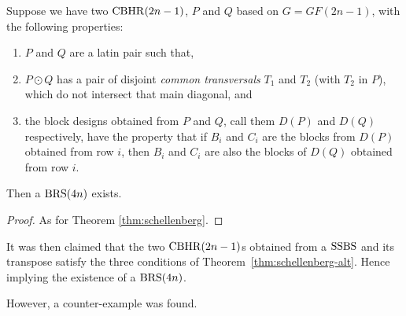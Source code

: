 \begin{theorem}
Suppose we have two $\operatorname{CBHR}(2n - 1)$, $P$ and $Q$ based on $G = GF(2n - 1)$, with the following properties:
\begin{enumerate}
  \item{$P$ and $Q$ are a latin pair such that,}
  \item{$P \odot Q$ has a pair of disjoint
    \emph{common transversals} $T_1$ and $T_2$
    (with $T_2$ in $P$), which do not intersect that main
    diagonal, and}
  \item{the block designs obtained from $P$ and $Q$, call
    them $D(P)$ and $D(Q)$ respectively, have the property
    that if $B_i$ and $C_i$ are the blocks from $D(P)$
    obtained from row $i$, then $B_i$ and $C_i$
    are also the blocks of $D(Q)$ obtained from row $i$.}
\end{enumerate}

Then a $\operatorname{BRS}(4n)$ exists.
\label{thm:schellenberg-alt}
\end{theorem}

\begin{proof}
As for Theorem \ref{thm:schellenberg}.
\end{proof}

It was then claimed that the two $\operatorname{CBHR}(2n - 1)$s obtained from a $\operatorname{SSBS}$ and its transpose satisfy the three conditions of Theorem~\ref{thm:schellenberg-alt}.
Hence implying the existence of a $\operatorname{BRS}(4n)$.

However, a counter-example was found.

